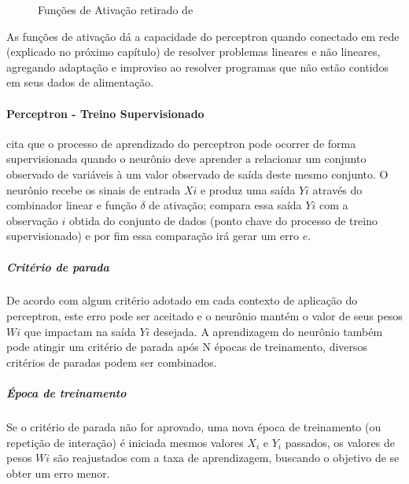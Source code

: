 \documentclass[	12pt, Times, openright, twoside, a4paper, english, brazil]{abntex2}
\begin{document}
			     \begin{figure}[!ht]
    				\caption{Funções de Ativação retirado de \cite{Flavia2014} \label{fig:perceptron}}
			     \end{figure}
			
				    As funções de ativação dá a capacidade do perceptron quando conectado em rede (explicado no próximo capítulo) de resolver problemas lineares e não lineares, agregando adaptação e improviso ao resolver programas que não estão contidos em seus dados de alimentação.
			
		      \paragraph*{Perceptron - Treino Supervisionado}
            \cite{Almeida2013} cita que o processo de aprendizado do perceptron pode ocorrer de forma supervisionada quando o neurônio deve aprender a relacionar um conjunto observado de variáveis à um valor observado de saída deste mesmo conjunto. O neurônio recebe os sinais de entrada $Xi$ e produz uma saída $Yi$ através do combinador linear e função $\delta$ de ativação; compara essa saída $Yi$ com a observação $i$ obtida do conjunto de dados (ponto chave do processo de treino supervisionado) e por fim essa comparação irá gerar um erro $e$.
            
            \subparagraph* {Critério de parada}
            	De acordo com algum critério adotado em cada contexto de aplicação do perceptron, este erro pode ser aceitado e o neurônio mantém o valor de seus pesos $Wi$ que impactam na saída $Yi$ desejada. A aprendizagem do neurônio também pode atingir um critério de parada após N épocas de treinamento, diversos critérios de paradas  podem ser combinados.  
            	
            \subparagraph* {Época de treinamento}
            	Se o critério de parada não for aprovado, uma nova época de treinamento (ou repetição de interação) é iniciada mesmos valores $X_i$ e $Y_i$ passados, os valores de pesos $Wi$ são reajustados com a taxa de aprendizagem, buscando o objetivo de se obter um erro menor.
            	
\end{document}
